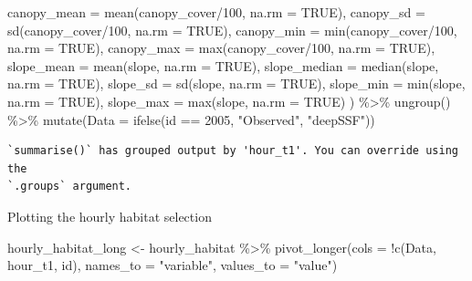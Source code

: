 \documentclass[
  letterpaper,
  DIV=11,
  numbers=noendperiod]{scrartcl}
\newenvironment{Shaded}{\begin{snugshade}}{\end{snugshade}}
\newcommand{\AttributeTok}[1]{\textcolor[rgb]{0.40,0.45,0.13}{#1}}
\newcommand{\ConstantTok}[1]{\textcolor[rgb]{0.56,0.35,0.01}{#1}}
\newcommand{\DecValTok}[1]{\textcolor[rgb]{0.68,0.00,0.00}{#1}}
\newcommand{\FunctionTok}[1]{\textcolor[rgb]{0.28,0.35,0.67}{#1}}
\newcommand{\NormalTok}[1]{\textcolor[rgb]{0.00,0.23,0.31}{#1}}
\newcommand{\OtherTok}[1]{\textcolor[rgb]{0.00,0.23,0.31}{#1}}
\newcommand{\SpecialCharTok}[1]{\textcolor[rgb]{0.37,0.37,0.37}{#1}}
\newcommand{\StringTok}[1]{\textcolor[rgb]{0.13,0.47,0.30}{#1}}
\begin{document}
\begin{Shaded}
\begin{Highlighting}[]
              \AttributeTok{canopy\_mean =} \FunctionTok{mean}\NormalTok{(canopy\_cover}\SpecialCharTok{/}\DecValTok{100}\NormalTok{, }\AttributeTok{na.rm =} \ConstantTok{TRUE}\NormalTok{),}
              \AttributeTok{canopy\_sd =} \FunctionTok{sd}\NormalTok{(canopy\_cover}\SpecialCharTok{/}\DecValTok{100}\NormalTok{, }\AttributeTok{na.rm =} \ConstantTok{TRUE}\NormalTok{),}
              \AttributeTok{canopy\_min =} \FunctionTok{min}\NormalTok{(canopy\_cover}\SpecialCharTok{/}\DecValTok{100}\NormalTok{, }\AttributeTok{na.rm =} \ConstantTok{TRUE}\NormalTok{),}
              \AttributeTok{canopy\_max =} \FunctionTok{max}\NormalTok{(canopy\_cover}\SpecialCharTok{/}\DecValTok{100}\NormalTok{, }\AttributeTok{na.rm =} \ConstantTok{TRUE}\NormalTok{),}
              \AttributeTok{slope\_mean =} \FunctionTok{mean}\NormalTok{(slope, }\AttributeTok{na.rm =} \ConstantTok{TRUE}\NormalTok{),}
              \AttributeTok{slope\_median =} \FunctionTok{median}\NormalTok{(slope, }\AttributeTok{na.rm =} \ConstantTok{TRUE}\NormalTok{),}
              \AttributeTok{slope\_sd =} \FunctionTok{sd}\NormalTok{(slope, }\AttributeTok{na.rm =} \ConstantTok{TRUE}\NormalTok{),}
              \AttributeTok{slope\_min =} \FunctionTok{min}\NormalTok{(slope, }\AttributeTok{na.rm =} \ConstantTok{TRUE}\NormalTok{),}
              \AttributeTok{slope\_max =} \FunctionTok{max}\NormalTok{(slope, }\AttributeTok{na.rm =} \ConstantTok{TRUE}\NormalTok{)}
\NormalTok{              ) }\SpecialCharTok{\%\textgreater{}\%} \FunctionTok{ungroup}\NormalTok{() }\SpecialCharTok{\%\textgreater{}\%} 
  \FunctionTok{mutate}\NormalTok{(}\AttributeTok{Data =} \FunctionTok{ifelse}\NormalTok{(id }\SpecialCharTok{==} \DecValTok{2005}\NormalTok{, }\StringTok{"Observed"}\NormalTok{, }\StringTok{"deepSSF"}\NormalTok{))}
\end{Highlighting}
\end{Shaded}

\begin{verbatim}
`summarise()` has grouped output by 'hour_t1'. You can override using the
`.groups` argument.
\end{verbatim}

Plotting the hourly habitat selection

\begin{Shaded}
\begin{Highlighting}[]
\NormalTok{hourly\_habitat\_long }\OtherTok{\textless{}{-}}\NormalTok{ hourly\_habitat }\SpecialCharTok{\%\textgreater{}\%}
  \FunctionTok{pivot\_longer}\NormalTok{(}\AttributeTok{cols =} \SpecialCharTok{!}\FunctionTok{c}\NormalTok{(Data, hour\_t1, id), }\AttributeTok{names\_to =} \StringTok{"variable"}\NormalTok{, }\AttributeTok{values\_to =} \StringTok{"value"}\NormalTok{)}
\end{Highlighting}
\end{Shaded}
\end{document}
